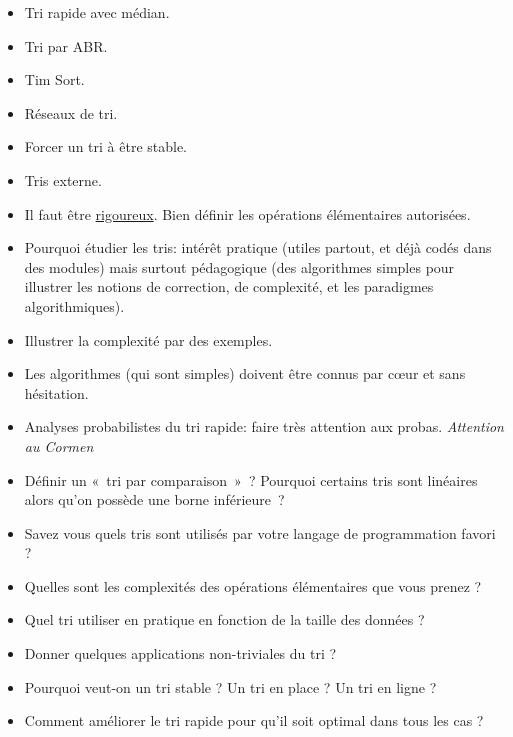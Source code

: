 \documentclass{agregfiche}
\begin{document}
\secidees

\begin{itemize}
    \item Tri rapide avec médian.
    \item Tri par ABR.
    \item Tim Sort.
    \item Réseaux de tri.
    \item Forcer un tri à être stable.
    \item Tris externe.
\end{itemize}

\secpieges

\begin{itemize}
    \item Il faut être \underline{rigoureux}. Bien définir les opérations élémentaires autorisées.
    \item Pourquoi étudier les tris: intérêt pratique (utiles partout, et déjà codés dans des modules) mais surtout pédagogique (des algorithmes simples pour illustrer les notions de correction, de complexité, et les paradigmes algorithmiques).
    \item Illustrer la complexité par des exemples.
    \item Les algorithmes (qui sont simples) doivent être connus par c\oe ur et sans hésitation.
    \item Analyses probabilistes du tri rapide: faire très attention aux probas.
        \emph{Attention au Cormen}
\end{itemize}


\secquestionsclassiques

\begin{itemize}
    \item Définir un «~tri par comparaison~»~? Pourquoi certains tris sont linéaires
        alors qu'on possède une borne inférieure~?
    \item Savez vous quels tris sont utilisés par votre langage de programmation
        favori ?
    \item Quelles sont les complexités des opérations élémentaires que vous
        prenez ?
    \item Quel tri utiliser en pratique en fonction de la taille des données ?
    \item Donner quelques applications non-triviales du tri ? %
    \item Pourquoi veut-on un tri stable ? Un tri en place ? Un tri en ligne ?
    \item Comment améliorer le tri rapide pour qu'il soit optimal dans tous les cas ?
\end{itemize}
\end{document}
